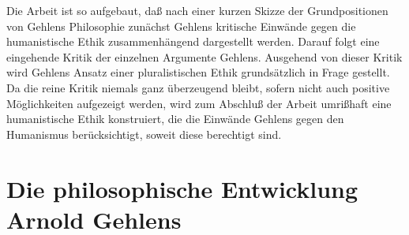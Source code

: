 \documentclass[12pt,a4paper]{article}
\begin{document}
Die Arbeit ist so aufgebaut, daß nach einer kurzen Skizze der
Grundpositionen von Gehlens Philosophie zunächst Gehlens kritische
Einwände gegen die humanistische Ethik zusammenhängend dargestellt
werden. Darauf folgt eine eingehende Kritik der einzelnen Argumente
Gehlens. Ausgehend von dieser Kritik wird Gehlens Ansatz einer
pluralistischen Ethik grundsätzlich in Frage gestellt. Da die reine
Kritik niemals ganz überzeugend bleibt, sofern nicht auch positive
Möglichkeiten aufgezeigt werden, wird zum Abschluß der Arbeit umrißhaft
eine humanistische Ethik konstruiert, die die Einwände Gehlens gegen den
Humanismus berücksichtigt, soweit diese berechtigt sind.

\section{Die philosophische Entwicklung Arnold Gehlens}
\end{document}
